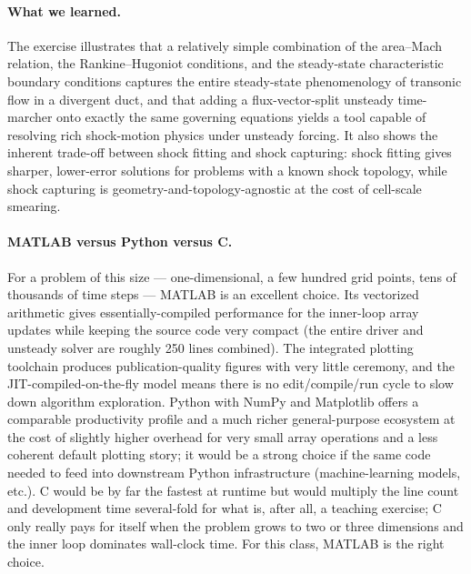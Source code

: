 \paragraph{What we learned.}
The exercise illustrates that a relatively simple combination of the area--Mach relation, the Rankine--Hugoniot conditions, and the steady-state characteristic boundary conditions captures the entire steady-state phenomenology of transonic flow in a divergent duct, and that adding a flux-vector-split unsteady time-marcher onto exactly the same governing equations yields a tool capable of resolving rich shock-motion physics under unsteady forcing. It also shows the inherent trade-off between shock fitting and shock capturing: shock fitting gives sharper, lower-error solutions for problems with a known shock topology, while shock capturing is geometry-and-topology-agnostic at the cost of cell-scale smearing.

\paragraph{MATLAB versus Python versus C.}
For a problem of this size --- one-dimensional, a few hundred grid points, tens of thousands of time steps --- MATLAB is an excellent choice. Its vectorized arithmetic gives essentially-compiled performance for the inner-loop array updates while keeping the source code very compact (the entire driver and unsteady solver are roughly 250 lines combined). The integrated plotting toolchain produces publication-quality figures with very little ceremony, and the JIT-compiled-on-the-fly model means there is no edit/compile/run cycle to slow down algorithm exploration. Python with NumPy and Matplotlib offers a comparable productivity profile and a much richer general-purpose ecosystem at the cost of slightly higher overhead for very small array operations and a less coherent default plotting story; it would be a strong choice if the same code needed to feed into downstream Python infrastructure (machine-learning models, etc.). C would be by far the fastest at runtime but would multiply the line count and development time several-fold for what is, after all, a teaching exercise; C only really pays for itself when the problem grows to two or three dimensions and the inner loop dominates wall-clock time. For this class, MATLAB is the right choice.

